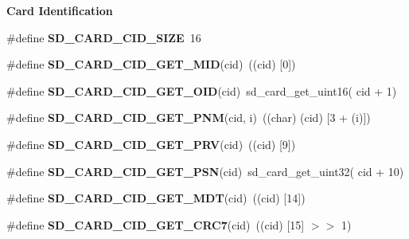 \begin{Indent}\textbf{ Card Identification}\par
\begin{DoxyCompactItemize}
\item 
\mbox{\label{spi-sd-card_8c_acc9de782919281bd0e3c12cc17dada23}} 
\#define {\bfseries S\+D\+\_\+\+C\+A\+R\+D\+\_\+\+C\+I\+D\+\_\+\+S\+I\+ZE}~16
\item 
\mbox{\label{spi-sd-card_8c_a8109f2e3364d5797f498f591ee5dbc29}} 
\#define {\bfseries S\+D\+\_\+\+C\+A\+R\+D\+\_\+\+C\+I\+D\+\_\+\+G\+E\+T\+\_\+\+M\+ID}(cid)~((cid) \mbox{[}0\mbox{]})
\item 
\mbox{\label{spi-sd-card_8c_aa4613bc9ed07c316f6c69e8705eff7a8}} 
\#define {\bfseries S\+D\+\_\+\+C\+A\+R\+D\+\_\+\+C\+I\+D\+\_\+\+G\+E\+T\+\_\+\+O\+ID}(cid)~sd\+\_\+card\+\_\+get\+\_\+uint16( cid + 1)
\item 
\mbox{\label{spi-sd-card_8c_a4aa233733bfb044832e1dcb6a924c73b}} 
\#define {\bfseries S\+D\+\_\+\+C\+A\+R\+D\+\_\+\+C\+I\+D\+\_\+\+G\+E\+T\+\_\+\+P\+NM}(cid,  i)~((char) (cid) \mbox{[}3 + (i)\mbox{]})
\item 
\mbox{\label{spi-sd-card_8c_af57f6ee8c921f04c7bdd5be25dfe21b0}} 
\#define {\bfseries S\+D\+\_\+\+C\+A\+R\+D\+\_\+\+C\+I\+D\+\_\+\+G\+E\+T\+\_\+\+P\+RV}(cid)~((cid) \mbox{[}9\mbox{]})
\item 
\mbox{\label{spi-sd-card_8c_aada3edd3b8abd0434e85bb9f48718597}} 
\#define {\bfseries S\+D\+\_\+\+C\+A\+R\+D\+\_\+\+C\+I\+D\+\_\+\+G\+E\+T\+\_\+\+P\+SN}(cid)~sd\+\_\+card\+\_\+get\+\_\+uint32( cid + 10)
\item 
\mbox{\label{spi-sd-card_8c_a85490ce10a6b0e3b79136509f6dacc44}} 
\#define {\bfseries S\+D\+\_\+\+C\+A\+R\+D\+\_\+\+C\+I\+D\+\_\+\+G\+E\+T\+\_\+\+M\+DT}(cid)~((cid) \mbox{[}14\mbox{]})
\item 
\mbox{\label{spi-sd-card_8c_adae37150aa4711503ca7ebd9129a5dae}} 
\#define {\bfseries S\+D\+\_\+\+C\+A\+R\+D\+\_\+\+C\+I\+D\+\_\+\+G\+E\+T\+\_\+\+C\+R\+C7}(cid)~((cid) \mbox{[}15\mbox{]} $>$$>$ 1)
\end{DoxyCompactItemize}
\end{Indent}
